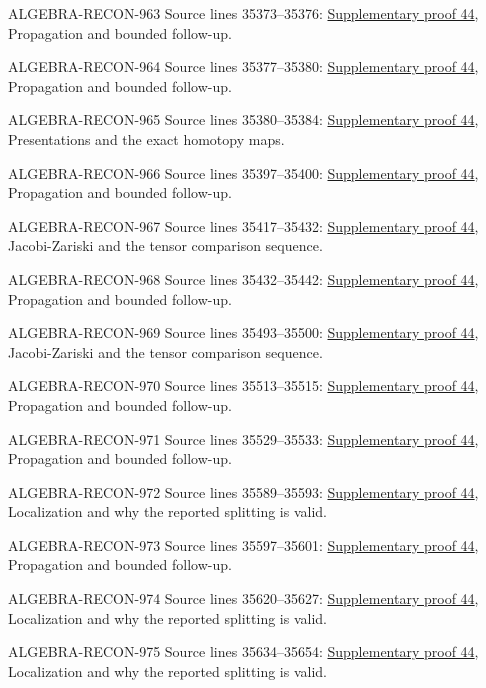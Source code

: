 \begin{AlgebraSourceRoutes}
\item[ALGEBRA-RECON-963] Source lines 35373--35376: \hyperlink{algebra_naive_cotangent_notes_20260928}{Supplementary proof 44}, Propagation and bounded follow-up.
\item[ALGEBRA-RECON-964] Source lines 35377--35380: \hyperlink{algebra_naive_cotangent_notes_20260928}{Supplementary proof 44}, Propagation and bounded follow-up.
\item[ALGEBRA-RECON-965] Source lines 35380--35384: \hyperlink{algebra_naive_cotangent_notes_20260928}{Supplementary proof 44}, Presentations and the exact homotopy maps.
\item[ALGEBRA-RECON-966] Source lines 35397--35400: \hyperlink{algebra_naive_cotangent_notes_20260928}{Supplementary proof 44}, Propagation and bounded follow-up.
\item[ALGEBRA-RECON-967] Source lines 35417--35432: \hyperlink{algebra_naive_cotangent_notes_20260928}{Supplementary proof 44}, Jacobi-Zariski and the tensor comparison sequence.
\item[ALGEBRA-RECON-968] Source lines 35432--35442: \hyperlink{algebra_naive_cotangent_notes_20260928}{Supplementary proof 44}, Propagation and bounded follow-up.
\item[ALGEBRA-RECON-969] Source lines 35493--35500: \hyperlink{algebra_naive_cotangent_notes_20260928}{Supplementary proof 44}, Jacobi-Zariski and the tensor comparison sequence.
\item[ALGEBRA-RECON-970] Source lines 35513--35515: \hyperlink{algebra_naive_cotangent_notes_20260928}{Supplementary proof 44}, Propagation and bounded follow-up.
\item[ALGEBRA-RECON-971] Source lines 35529--35533: \hyperlink{algebra_naive_cotangent_notes_20260928}{Supplementary proof 44}, Propagation and bounded follow-up.
\item[ALGEBRA-RECON-972] Source lines 35589--35593: \hyperlink{algebra_naive_cotangent_notes_20260928}{Supplementary proof 44}, Localization and why the reported splitting is valid.
\item[ALGEBRA-RECON-973] Source lines 35597--35601: \hyperlink{algebra_naive_cotangent_notes_20260928}{Supplementary proof 44}, Propagation and bounded follow-up.
\item[ALGEBRA-RECON-974] Source lines 35620--35627: \hyperlink{algebra_naive_cotangent_notes_20260928}{Supplementary proof 44}, Localization and why the reported splitting is valid.
\item[ALGEBRA-RECON-975] Source lines 35634--35654: \hyperlink{algebra_naive_cotangent_notes_20260928}{Supplementary proof 44}, Localization and why the reported splitting is valid.

\end{AlgebraSourceRoutes}
